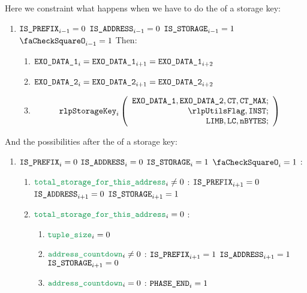\begin{enumerate}[resume]
		Here we constraint what happens when we have to do the \rlp{} of a storage key:
		\begin{enumerate}[resume]
			\item \If $\texttt{IS\_PREFIX} _{i - 1} = 0$ \et $\texttt{IS\_ADDRESS} _{i - 1} = 0$ \et $\texttt{IS\_STORAGE} _{i - 1} = 1$ \et $\done _{i - 1} =1$ Then:
				\begin{enumerate}
					\item $\texttt{EXO\_DATA\_1} _{i} = \texttt{EXO\_DATA\_1} _{i + 1} = \texttt{EXO\_DATA\_1} _{i + 2}$
					\item $\texttt{EXO\_DATA\_2} _{i} = \texttt{EXO\_DATA\_2} _{i + 1} = \texttt{EXO\_DATA\_2} _{i + 2}$
					\item \[
							\rlpStorageKey _{i}
							\left(
							\begin{array}{r}
								\exoDataColumn{1},
								\exoDataColumn{2},
								\ct,
								\maxCt; \\
								\rlpUtilsFlag,
								\INST; \\
								\limb,
								\lc,
								\limbsize; \\
							\end{array}
							\right)
						\]
				\end{enumerate}
		\end{enumerate}
		And the possibilities after the \rlp{} of a storage key:
		\begin{enumerate}[resume]
			\item \If $\texttt{IS\_PREFIX} _{i} = 0$ \et $\texttt{IS\_ADDRESS} _{i} = 0$ \et $\texttt{IS\_STORAGE} _{i} = 1$ \et $\done _{i} =1$ \Then:
				\begin{enumerate}
					\item \If $\locTotStorageForThisAddress _{i} \neq 0$ \Then: $\texttt{IS\_PREFIX} _{i + 1} = 0$ \et $\texttt{IS\_ADDRESS} _{i + 1} = 0$ \et $\texttt{IS\_STORAGE} _{i + 1} = 1$
					\item \If $\locTotStorageForThisAddress _{i} = 0$ \Then:
						\begin{enumerate}
							\item $\locAccessListTupleSize _{i} = 0$
							\item \If $\locAddressPrewarmingCountdown _{i} \neq 0$ \Then: $\texttt{IS\_PREFIX} _{i + 1} = 1$ \et $\texttt{IS\_ADDRESS} _{i + 1} = 1$ \et $\texttt{IS\_STORAGE} _{i + 1} = 0$
							\item \If $\locAddressPrewarmingCountdown _{i} = 0$ \Then: $\texttt{PHASE\_END} _{i} =1$
						\end{enumerate}
				\end{enumerate}
		\end{enumerate}


\end{enumerate}
